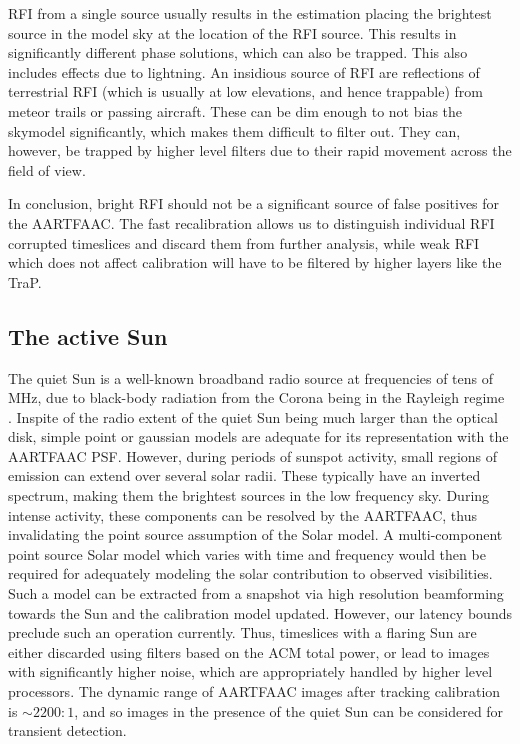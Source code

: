 \documentclass{aa}
\begin{document}
RFI from a single source usually results in the estimation placing the brightest
source in  the model sky  at the  location of the  RFI source.  This  results in
significantly different  phase solutions, which  can also be trapped.  This also
includes effects due  to lightning.  An insidious source  of RFI are reflections
of terrestrial  RFI (which  is usually at  low elevations, and  hence trappable)
from meteor trails or passing aircraft.  These can be dim enough to not bias the
skymodel significantly,  which makes  them difficult to  filter out.   They can,
however, be trapped  by higher level filters due to  their rapid movement across
the field of view.  

In conclusion, bright RFI should not  be a significant source of false positives
for the  AARTFAAC.  The fast  recalibration allows us to  distinguish individual
RFI corrupted timeslices and discard  them from further analysis, while weak RFI
which does not affect calibration will have to be filtered by higher layers like
the TraP.

\subsection{The active Sun}

The quiet Sun  is a well-known broadband radio source at  frequencies of tens of
MHz, due to black-body radiation from  the Corona being in the Rayleigh regime .
Inspite of the radio extent of the  quiet Sun being much larger than the optical
disk, simple point  or gaussian models are adequate  for its representation with
the AARTFAAC PSF.  However, during periods of sunspot activity, small regions of
emission can extend  over several solar radii. These  typically have an inverted
spectrum, making  them the  brightest sources in  the low frequency  sky. During
intense  activity,  these components  can  be  resolved  by the  AARTFAAC,  thus
invalidating the point  source assumption of the Solar  model. A multi-component
point source  Solar model  which varies  with time and  frequency would  then be
required   for  adequately   modeling   the  solar   contribution  to   observed
visibilities. Such a model can be  extracted from a snapshot via high resolution
beamforming towards  the Sun  and the calibration  model updated.   However, our
latency bounds  preclude such an  operation currently.  Thus, timeslices  with a
flaring Sun are either discarded using  filters based on the ACM total power, or
lead to images with significantly  higher noise, which are appropriately handled
by higher level processors. The  dynamic range of AARTFAAC images after tracking
calibration is $\sim2200:1$, and so images  in the presence of the quiet Sun can
be considered for transient detection.
\end{document}
